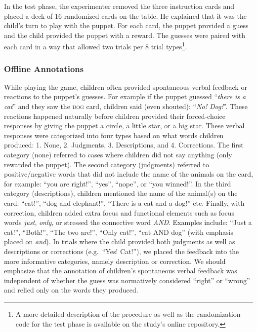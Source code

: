 \documentclass[
  english,
  ,man,floatsintext]{apa6}
\begin{document}
In the test phase, the experimenter removed the three instruction cards and placed a deck of 16 randomized cards on the table. He explained that it was the child's turn to play with the puppet. For each card, the puppet provided a guess and the child provided the puppet with a reward. The guesses were paired with each card in a way that allowed two trials per 8 trial types\footnote{A more detailed description of the procedure as well as the randomization code for the test phase is available on the study's online repository.}.

\hypertarget{feedbackCoding}{%
\subsubsection{Offline Annotations}\label{feedbackCoding}}

While playing the game, children often provided spontaneous verbal feedback or reactions to the puppet's guesses. For example if the puppet guessed \enquote{\emph{there is a cat}} and they saw the \textsc{dog} card, children said (even shouted): \enquote{\emph{No! Dog!}}. These reactions happened naturally before children provided their forced-choice responses by giving the puppet a circle, a little star, or a big star. These verbal responses were categorized into four types based on what words children produced: 1. None, 2. Judgments, 3. Descriptions, and 4. Corrections. The first category (none) referred to cases where children did not say anything (only rewarded the puppet). The second category (judgments) referred to positive/negative words that did not include the name of the animals on the card, for example: \enquote{you are right!}, \enquote{yes}, \enquote{nope}, or \enquote{you winned!}. In the third category (descriptions), children mentioned the name of the animal(s) on the card: \enquote{cat!}, \enquote{dog and elephant!}, \enquote{There is a cat and a dog!} etc. Finally, with correction, children added extra focus and functional elements such as focus words \emph{just}, \emph{only}, or stressed the connective word \emph{AND}. Examples include: \enquote{Just a cat!}, \enquote{Both!}, \enquote{The two are!}, \enquote{Only cat!}, \enquote{cat AND dog} (with emphasis placed on \emph{and}). In trials where the child provided both judgments as well as descriptions or corrections (e.g.~\enquote{Yes! Cat!}), we placed the feedback into the more informative categories, namely description or correction. We should emphasize that the annotation of children's spontaneous verbal feedback was independent of whether the guess was normatively considered \enquote{right} or \enquote{wrong} and relied only on the words they produced.
\end{document}
